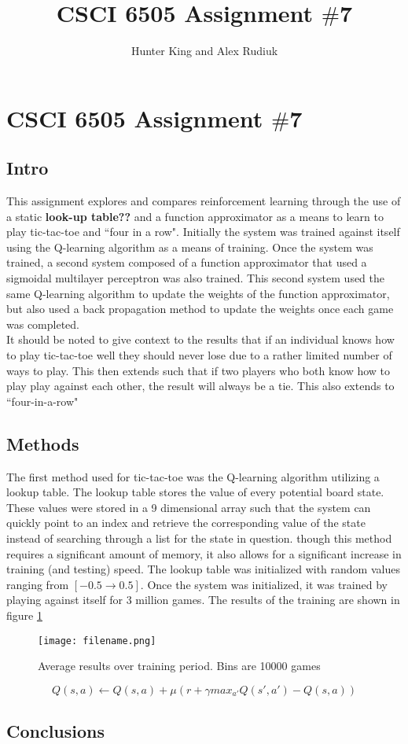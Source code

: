 \documentclass[12pt,a4paper]{article}
\author{Hunter King and Alex Rudiuk}
\title{CSCI 6505 Assignment $\#$7}
\begin{document}
\section*{CSCI 6505 Assignment $\#$7}
\subsection*{Intro}
This assignment explores and compares reinforcement learning through the use of a static \textbf{look-up table??} and a function approximator as a means to learn to play tic-tac-toe and ``four in a row". Initially the system was trained against itself using the Q-learning algorithm as a means of training. Once the system was trained, a second system composed of a function approximator that used a sigmoidal multilayer perceptron was also trained. This second system used the same Q-learning algorithm to update the weights of the function approximator, but also used a back propagation method to update the weights once each game was completed.\\
It should be noted to give context to the results that if an individual knows how to play tic-tac-toe well they should never lose due to a rather limited number of ways to play. This then extends such that if two players who both know how to play play against each other, the result will always be a tie. This also extends to ``four-in-a-row"
\subsection*{Methods}
The first method used for tic-tac-toe was the Q-learning algorithm utilizing a lookup table. The lookup table stores the value of every potential board state. These values were stored in a 9 dimensional array such that the system can quickly point to an index and retrieve the corresponding value of the state instead of searching through a list for the state in question. though this method requires a significant amount of memory, it also allows for a significant increase in training (and testing) speed. The lookup table was initialized with random values ranging from $[-0.5 \rightarrow 0.5]$. Once the system was initialized, it was trained by playing against itself for 3 million games. The results of the training are shown in figure \ref{fig:training}
\begin{figure}[h]
\centering
\texttt{[image: filename.png]}
\caption{Average results over training period. Bins are 10000 games}
\label{fig:training}
\end{figure}

\begin{equation}
{Q(s,a)} \leftarrow {Q(s,a) + \mu(r + \gamma max_{a'}Q(s',a')-Q(s,a))}
\end{equation}
\subsection*{Conclusions}
\end{document}
